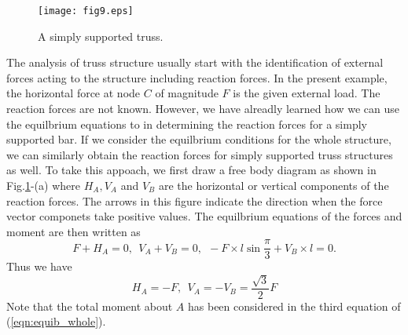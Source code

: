 \documentclass[10pt,a4j]{article}
\begin{document}
\begin{figure}[h]
	\begin{center}
	\texttt{[image: fig9.eps]} 
	\end{center}
	\caption{A simply supported truss.} 
	\label{fig:fig9}
\end{figure}
The analysis of truss structure usually start with the identification of 
external forces acting to the structure including reaction forces. 
In the present example, the horizontal force at node $C$ of magnitude $F$ 
is the given external load. The reaction forces are not known. 
However, we have alreadly learned how we can use the equilbrium equations to 
in determining the reaction forces for a simply supported bar. 
If we consider the equilbrium conditions for the whole structure, 
we can similarly obtain the reaction forces for simply supported truss structures 
as well. To take this appoach, we first draw a free body diagram as shown in 
Fig.\ref{fig:fig9}-(a) where $H_A, V_A$ and $V_B$ are the horizontal 
or vertical components of the reaction forces. The arrows in this figure 
indicate the direction when the force vector componets take positive values. 
The equilbrium equations of the forces and moment are then written as 
\begin{equation}
	F+H_A=0, \ \ V_A+V_B=0, \ \ -F\times l\sin\frac{\pi}{3}+V_B\times l=0. 
	\label{eqn:equib_whole}
\end{equation}
Thus we have 
\begin{equation}
	H_A=-F, \ \ V_A=-V_B=\frac{\sqrt{3}}{2}F
	\label{eqn:reac_frc}
\end{equation}
Note that the total moment about $A$ has been considered in the third equation of (\ref{eqn:equib_whole}).
\end{document}
